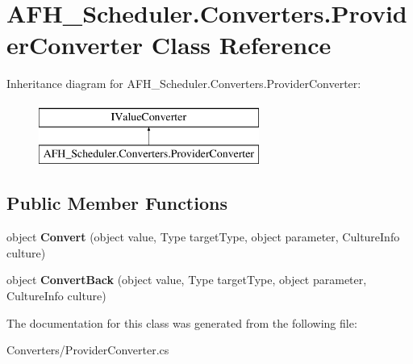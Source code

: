 \section{A\+F\+H\+\_\+\+Scheduler.\+Converters.\+Provider\+Converter Class Reference}
\label{class_a_f_h___scheduler_1_1_converters_1_1_provider_converter}
Inheritance diagram for A\+F\+H\+\_\+\+Scheduler.\+Converters.\+Provider\+Converter\+:\begin{figure}[H]
\begin{center}
\leavevmode
\includegraphics[height=2.000000cm]{class_a_f_h___scheduler_1_1_converters_1_1_provider_converter}
\end{center}
\end{figure}
\subsection*{Public Member Functions}
\begin{DoxyCompactItemize}
\item 
\mbox{\label{class_a_f_h___scheduler_1_1_converters_1_1_provider_converter_a85e23aa8d94089b37689e43c1092d729}} 
object {\bfseries Convert} (object value, Type target\+Type, object parameter, Culture\+Info culture)
\item 
\mbox{\label{class_a_f_h___scheduler_1_1_converters_1_1_provider_converter_a18741bb5c7b1d2629de5ed08f85eb5dd}} 
object {\bfseries Convert\+Back} (object value, Type target\+Type, object parameter, Culture\+Info culture)
\end{DoxyCompactItemize}


The documentation for this class was generated from the following file\+:\begin{DoxyCompactItemize}
\item 
Converters/Provider\+Converter.\+cs\end{DoxyCompactItemize}
